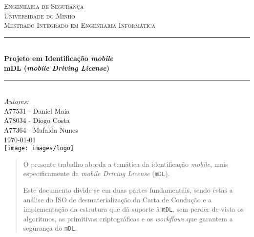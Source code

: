 \documentclass[11pt]{article}
\begin{document}
\sloppy

\begin{titlepage}

\newcommand{\HRule}{\rule{\linewidth}{0.5mm}}

\center %
 
\textsc{\LARGE Engenharia de Segurança}\\[1.5cm]
\textsc{\Large Universidade do Minho}\\[0.5cm]
\textsc{\large Mestrado Integrado em Engenharia Informática}\\[0.6cm]

\vspace{0.8cm}
\HRule \\[0.6cm]
{ \huge \bfseries Projeto em Identificação \textit{mobile}}\\[0.4cm]
{ \Large \bfseries \textbf{mDL} (\textit{mobile Driving License})} \\[0.4cm]
\HRule \\[1.2cm]

\Large \emph{Autores:}\\
A77531 - Daniel Maia\\
A78034 - Diogo Costa\\
A77364 - Mafalda Nunes\\[1.3cm]

{\large \today}\\[1.5cm]

\texttt{[image: images/logo]}\\[1cm]

\vfill %

\end{titlepage}


\begin{abstract}
O presente trabalho aborda a temática da identificação \textit{mobile}, mais especificamente da \textit{mobile Driving License} (\texttt{mDL}).

Este documento divide-se em duas partes fundamentais, sendo estas a análise do ISO de desmaterialização da Carta de Condução e a implementação da estrutura que dá suporte à \texttt{mDL}, sem perder de vista os algoritmos, as primitivas criptográficas e os \textit{workflows} que garantem a segurança do \texttt{mDL}.
\end{abstract}
\end{document}
